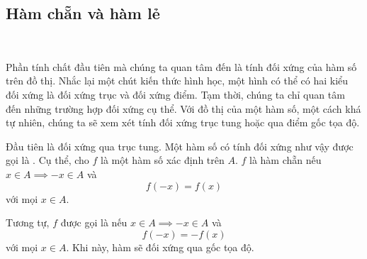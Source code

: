 \subsection{Hàm chẵn và hàm lẻ}

\ %

Phần tính chất đầu tiên mà chúng ta quan tâm đến là tính đối xứng của hàm số trên đồ thị. Nhắc lại một chút kiến thức hình học, một hình có thể có hai kiểu đối xứng là đối xứng trục và đối xứng điểm. Tạm thời, chúng ta chỉ quan tâm đến những trường hợp đối xứng cụ thể. Với đồ thị của một hàm số, một cách khá tự nhiên, chúng ta sẽ xem xét tính đối xứng trục tung hoặc qua điểm gốc tọa độ. 

Đầu tiên là đối xứng qua trục tung. Một hàm số có tính đối xứng như vậy được gọi là . Cụ thể, cho $f$ là một hàm số xác định trên $A$. $f$ là hàm chẵn nếu $x \in A \implies -x \in A$ và $$f(-x) = f(x)$$ với mọi $x \in A$. 

Tương tự, $f$ được gọi là  nếu $x \in A \implies -x \in A$ và $$f(-x) = -f(x)$$ với mọi $x \in A$. Khi này, hàm sẽ đối xứng qua gốc tọa độ.

